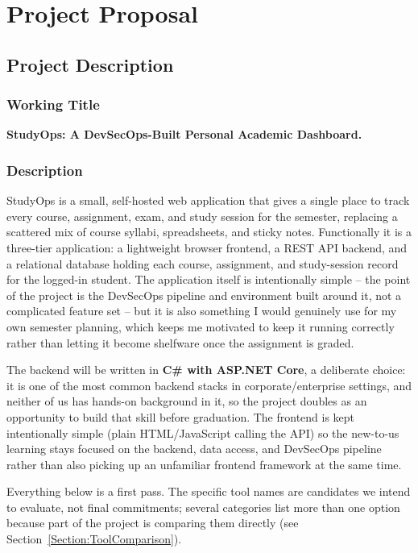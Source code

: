 \chapter{Project Proposal}

\section{Project Description}

\subsection{Working Title}
\textbf{StudyOps: A DevSecOps-Built Personal Academic Dashboard.}

\subsection{Description}
StudyOps is a small, self-hosted web application that gives a single place to
track every course, assignment, exam, and study session for the semester,
replacing a scattered mix of course syllabi, spreadsheets, and sticky notes.
Functionally it is a three-tier application: a lightweight browser frontend,
a REST API backend, and a relational database holding each course,
assignment, and study-session record for the logged-in student. The
application itself is intentionally simple -- the point of the project is
the DevSecOps pipeline and environment built around it, not a complicated
feature set -- but it is also something I would genuinely use for my own
semester planning, which keeps me motivated to keep it running correctly
rather than letting it become shelfware once the assignment is graded.

The backend will be written in \textbf{C\# with ASP.NET Core}, a deliberate
choice: it is one of the most common backend stacks in corporate/enterprise
settings, and neither of us has hands-on background in it, so the project
doubles as an opportunity to build that skill before graduation. The
frontend is kept intentionally simple (plain HTML/JavaScript calling the
API) so the new-to-us learning stays focused on the backend, data access,
and DevSecOps pipeline rather than also picking up an unfamiliar frontend
framework at the same time.

Everything below is a first pass. The specific tool names are candidates we
intend to evaluate, not final commitments; several categories list more than
one option because part of the project is comparing them directly (see
Section~\ref{Section:ToolComparison}).

